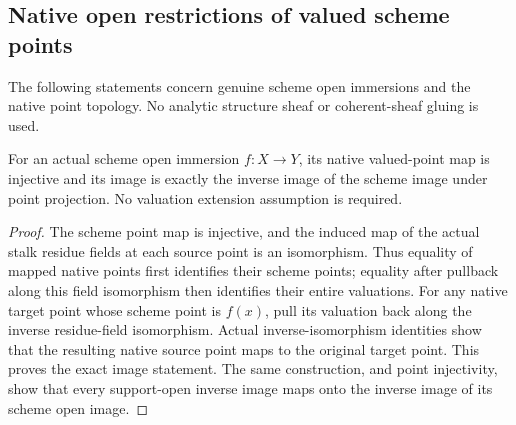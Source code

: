 \subsection{Native open restrictions of valued scheme points}
\label{subsec:native-open-immersions}

The following statements concern genuine scheme open immersions and the native
point topology. No analytic structure sheaf or coherent-sheaf gluing is used.

\begin{theorem}
\label{scheme:valued-open-immersion-image}
\leanok
{}
For an actual scheme open immersion $f:X\to Y$, its native valued-point map
is injective and its image is exactly the inverse image of the scheme image
under point projection. No valuation extension assumption is required.
\end{theorem}
\begin{proof}
The scheme point map is injective, and the induced map of the actual stalk
residue fields at each source point is an isomorphism. Thus equality of mapped
native points first identifies their scheme points; equality after pullback
along this field isomorphism then identifies their entire valuations. For any
native target point whose scheme point is $f(x)$, pull its valuation back along
the inverse residue-field isomorphism. Actual inverse-isomorphism identities
show that the resulting native source point maps to the original target point.
This proves the exact image statement. The same construction, and point
injectivity, show that every support-open inverse image maps onto the inverse
image of its scheme open image.
\end{proof}

